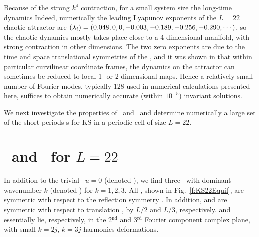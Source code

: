 Because of the strong $k^4$ contraction, for a small system
size the long-time dynamics
Indeed, numerically the leading Lyapunov exponents of the
$L=22$ chaotic attractor are
$(\lambda_i) = (0.048, 0, 0, -0.003, -0.189, -0.256, -0.290, \cdots)$,
so the chaotic dynamics mostly takes place close to a
4-dimensional manifold, with strong contraction in other
dimensions.  The two zero exponents are due to the time and
space translational symmetries of the \KSe, and it was shown
in  that within particular
curvilinear coordinate frames, the dynamics on the attractor
can sometimes be reduced to local 1- or 2-dimensional maps.
Hence a relatively small number of Fourier modes, typically
128 used in numerical calculations presented here, suffices
to obtain numerically accurate (within $10^{-5}$) invariant
solutions.

We next investigate the properties of \eqva\ and \reqva\ and
determine numerically a large set of the short periods \rpo s
for KS in a periodic cell of size $L=22$.

\section{\Eqva\ and \reqva\ for $L=22$}

In addition to the trivial \eqv\ $u=0$ (denoted ),
we find three \eqva\ with dominant wavenumber $k$
(denoted ) for $k = 1, 2, 3$.  All {\eqva}, shown in
Fig.~\ref{f:KS22Equil}, are symmetric with respect to the reflection
symmetry .
In addition,  and  are symmetric with respect
to translation , by $L/2$ and $L/3$, respectively.
 and  essentially lie, respectively, in
the 2$^\mathrm{nd}$ and 3$^\mathrm{rd}$ Fourier component complex plane,
with small $k=2j$, $k=3j$ harmonics deformations.

